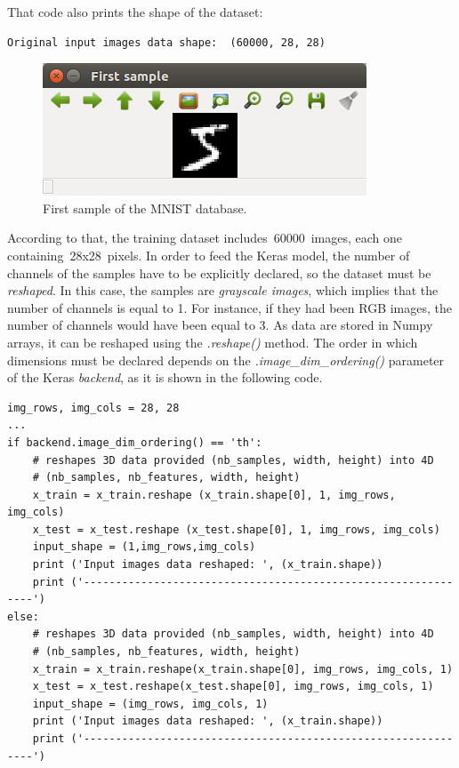That code also prints the shape of the dataset:
\begin{Verbatim}[frame=single]
Original input images data shape:  (60000, 28, 28)
\end{Verbatim}

\begin{figure}
	\centering
	\includegraphics[width=0.7\linewidth, keepaspectratio]{figures/first_sample.png}
	\caption{First sample of the MNIST database.}
	\label{fig:firstsample}
\end{figure}

According to that, the training dataset includes~60000~images, each one containing~28x28~pixels. In order to feed the Keras model, the number of channels of the samples have to be explicitly declared, so the dataset must be \emph{reshaped}. In this case, the samples are \emph{grayscale images}, which implies that the number of channels is equal to 1. For instance, if they had been RGB images, the number of channels would have been equal to 3. As data are stored in Numpy arrays, it can be reshaped using the \textit{.reshape()} method. The order in which dimensions must be declared depends on the \textit{.image\_dim\_ordering()} parameter of the Keras \textit{backend}, as it is shown in the following code.
\begin{lstlisting}
img_rows, img_cols = 28, 28
...
if backend.image_dim_ordering() == 'th':
	# reshapes 3D data provided (nb_samples, width, height) into 4D
	# (nb_samples, nb_features, width, height) 
	x_train = x_train.reshape (x_train.shape[0], 1, img_rows, img_cols)
	x_test = x_test.reshape (x_test.shape[0], 1, img_rows, img_cols)
	input_shape = (1,img_rows,img_cols)
	print ('Input images data reshaped: ', (x_train.shape))
	print ('--------------------------------------------------------------')
else:
	# reshapes 3D data provided (nb_samples, width, height) into 4D
	# (nb_samples, nb_features, width, height) 
	x_train = x_train.reshape(x_train.shape[0], img_rows, img_cols, 1)
	x_test = x_test.reshape(x_test.shape[0], img_rows, img_cols, 1)
	input_shape = (img_rows, img_cols, 1)
	print ('Input images data reshaped: ', (x_train.shape))
	print ('--------------------------------------------------------------')
\end{lstlisting}

